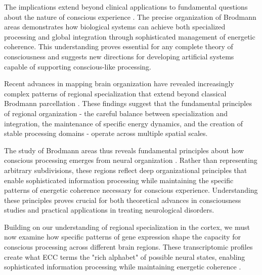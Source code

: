 The implications extend beyond clinical applications to fundamental questions about the nature of conscious experience \cite{Palomero-Gallagher2019}. The precise organization of Brodmann areas demonstrates how biological systems can achieve both specialized processing and global integration through sophisticated management of energetic coherence. This understanding proves essential for any complete theory of consciousness and suggests new directions for developing artificial systems capable of supporting conscious-like processing.

Recent advances in mapping brain organization have revealed increasingly complex patterns of regional specialization that extend beyond classical Brodmann parcellation \cite{Hawrylycz2012}. These findings suggest that the fundamental principles of regional organization - the careful balance between specialization and integration, the maintenance of specific energy dynamics, and the creation of stable processing domains - operate across multiple spatial scales.

The study of Brodmann areas thus reveals fundamental principles about how conscious processing emerges from neural organization \cite{Eickhoff2018}. Rather than representing arbitrary subdivisions, these regions reflect deep organizational principles that enable sophisticated information processing while maintaining the specific patterns of energetic coherence necessary for conscious experience. Understanding these principles proves crucial for both theoretical advances in consciousness studies and practical applications in treating neurological disorders.

Building on our understanding of regional specialization in the cortex, we must now examine how specific patterns of gene expression shape the capacity for conscious processing across different brain regions. These transcriptomic profiles create what ECC terms the "rich alphabet" of possible neural states, enabling sophisticated information processing while maintaining energetic coherence \cite{Lake2018}.